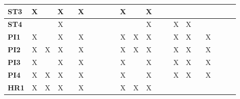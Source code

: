 \documentclass[12pt]{article}
\begin{document}
\begin{table}[H]
\begin{adjustwidth}{-0.8in}{-1.2in}
{\begin{tabular}{c|c|c|c|c|c|c|c|c|c|c|c|c|c|c|c|c|c|c|c|c|c}
\multicolumn{1}{|l|}{\textbf{ST3}}   &      X       &              &       X      &              &       X      &              &              &              &              &       X      &              &      X       &              &              &             &              &             &             &             &             \\ \hline
\multicolumn{1}{|l|}{\textbf{ST4}}   &              &              &       X      &              &              &              &              &              &              &              &              &      X       &              &              &      X      &      X       &             &             &             &             \\ \hline
\multicolumn{1}{|l|}{\textbf{PI1}}   &      X       &              &       X      &              &       X      &              &              &              &              &       X      &       X      &       X      &              &              &      X      &      X       &             &       X     &             &             \\ \hline
\multicolumn{1}{|l|}{\textbf{PI2}}   &      X       &       X      &       X      &              &       X      &              &              &              &              &        X     &       X      &       X      &              &              &      X      &      X       &             &       X     &             &             \\ \hline
\multicolumn{1}{|l|}{\textbf{PI3}}   &      X       &              &       X      &              &       X      &              &              &              &              &        X     &              &       X      &              &              &      X      &      X       &             &        X    &             &             \\ \hline
\multicolumn{1}{|l|}{\textbf{PI4}}   &      X       &       X      &       X      &              &       X      &              &              &              &              &       X      &              &       X      &              &              &      X      &      X       &             &       X     &             &             \\ \hline
\multicolumn{1}{|l|}{\textbf{HR1}}   &      X       &       X      &       X      &              &       X      &              &              &              &              &      X       &       X      &       X      &              &              &             &              &             &             &             &             \\ \hline

\end{tabular}}
\end{adjustwidth}
\end{table}
\end{document}
